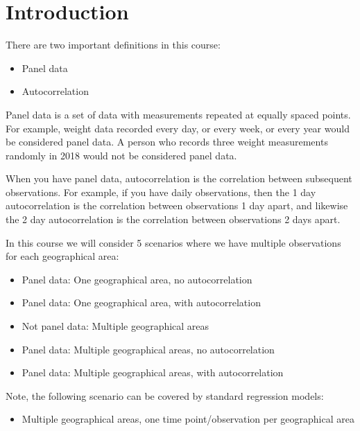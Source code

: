 \documentclass[]{book}
\providecommand{\tightlist}{%
  \setlength{\itemsep}{0pt}\setlength{\parskip}{0pt}}
\begin{document}
\newpage

\section{Introduction}\label{introduction}

There are two important definitions in this course:

\begin{itemize}
\tightlist
\item
  Panel data
\item
  Autocorrelation
\end{itemize}

Panel data is a set of data with measurements repeated at equally spaced
points. For example, weight data recorded every day, or every week, or
every year would be considered panel data. A person who records three
weight measurements randomly in 2018 would not be considered panel data.

When you have panel data, autocorrelation is the correlation between
subsequent observations. For example, if you have daily observations,
then the 1 day autocorrelation is the correlation between observations 1
day apart, and likewise the 2 day autocorrelation is the correlation
between observations 2 days apart.

In this course we will consider 5 scenarios where we have multiple
observations for each geographical area:

\begin{itemize}
\tightlist
\item
  Panel data: One geographical area, no autocorrelation
\item
  Panel data: One geographical area, with autocorrelation
\item
  Not panel data: Multiple geographical areas
\item
  Panel data: Multiple geographical areas, no autocorrelation
\item
  Panel data: Multiple geographical areas, with autocorrelation
\end{itemize}

Note, the following scenario can be covered by standard regression
models:

\begin{itemize}
\tightlist
\item
  Multiple geographical areas, one time point/observation per
  geographical area
\end{itemize}

\newpage
\end{document}
